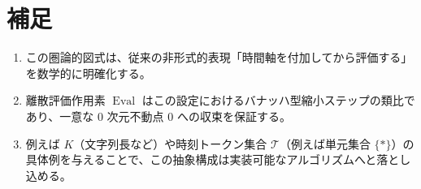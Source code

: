 \documentclass[12pt,a4paper]{article}
\newcommand{\dfix}{\mathfrak{0}}          %
\newcommand{\Tset}{\mathcal{T}}          %
\begin{document}
\section{補足}

\begin{enumerate}
  \item この圏論的図式は、従来の非形式的表現「時間軸を付加してから評価する」を数学的に明確化する。
  \item 離散評価作用素 $\operatorname{Eval}$ はこの設定におけるバナッハ型縮小ステップの類比であり、一意な $0$ 次元不動点 $\dfix$ への収束を保証する。
  \item 例えば $K$（文字列長など）や時刻トークン集合 $\Tset$（例えば単元集合 $\{*\}$）の具体例を与えることで、この抽象構成は実装可能なアルゴリズムへと落とし込める。
\end{enumerate}
\end{document}
